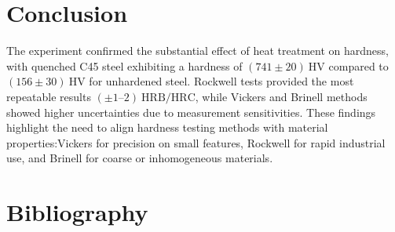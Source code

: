 \documentclass[a4paper]{article}
\newcommand{\unit}[1]{~\mathrm{#1}}
\begin{document}
\section{Conclusion}
The experiment confirmed the substantial effect of heat treatment on hardness,
with quenched C45 steel exhibiting a hardness of $(741 \pm 20)\unit{HV}$
compared to $(156 \pm 30)\unit{HV}$ for unhardened steel. Rockwell tests provided the most
repeatable
results $\mathrm{(\pm 1–2)\unit{HRB/HRC}}$, while Vickers and Brinell methods showed higher
uncertainties due to measurement sensitivities. These findings highlight the
need to align hardness testing methods with material properties:Vickers for
precision on small features, Rockwell for rapid industrial use, and Brinell for
coarse or inhomogeneous materials.
\section{Bibliography}


\end{document}
